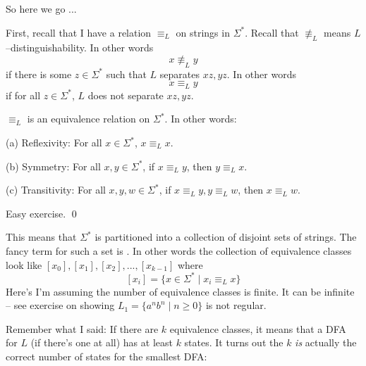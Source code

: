 So here we go ...

First, recall that I have a relation $\equiv_L$ on strings in $\Sigma^*$.
Recall that $\not\equiv_L$ means $L$--distinguishability.
In other words
\[
x \not\equiv_L y
\]
if there is some $z \in\Sigma^*$ such that $L$ separates $xz,yz$.
In other words
\[
x \equiv_L y
\]
if for all $z \in\Sigma^*$, $L$ does not separate $xz,yz$.

\begin{prop}
  $\equiv_L$ is an equivalence relation on $\Sigma^*$.
  In other words:
  \begin{tightlist}
    \item[\textnormal{(a)}] Reflexivity: For all $x \in \Sigma^*$, $x \equiv_L x$. 
    \item[\textnormal{(b)}] Symmetry: For all $x,y \in \Sigma^*$, if $x \equiv_L y$, then $y \equiv_L x$. 
    \item[\textnormal{(c)}] Transitivity: For all $x,y,w \in \Sigma^*$, if $x \equiv_L y, y \equiv_L w$, then $x \equiv_L w$. 
  \end{tightlist}
\end{prop}
\proof
Easy exercise.
\qed

This means that $\Sigma^*$ is partitioned into a collection of disjoint sets of strings.
The fancy term for such a set is .
In other words the collection of equivalence classes look like
$
[x_0],
[x_1],
[x_2],...,
[x_{k-1}]
$
where
\[
[x_i] = \{x \in \Sigma^* \mid x_i \equiv_L x \}
\]
Here's I'm assuming the number of equivalence classes is finite.
It can be infinite -- see exercise on showing $L_1 = \{a^n b^n \mid n \geq 0\}$ is not regular.

Remember what I said: If there are $k$ equivalence classes,
it means that a DFA for $L$ (if there's one at all) has at least $k$ states.
It turns out the $k$ \textit{is} actually the correct number of states for the smallest DFA:


